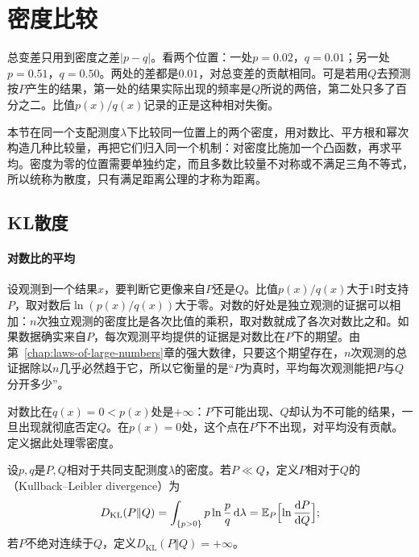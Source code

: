 \section{密度比较}
\label{sec:dcomp-density}

总变差只用到密度之差$\lvert p-q\rvert$。看两个位置：一处$p=0.02$，$q=0.01$；另一处$p=0.51$，$q=0.50$。两处的差都是$0.01$，对总变差的贡献相同。可是若用$Q$去预测按$P$产生的结果，第一处的结果实际出现的频率是$Q$所说的两倍，第二处只多了百分之二。比值$p(x)/q(x)$记录的正是这种相对失衡。

本节在同一个支配测度$\lambda$下比较同一位置上的两个密度，用对数比、平方根和幂次构造几种比较量，再把它们归入同一个机制：对密度比施加一个凸函数，再求平均。密度为零的位置需要单独约定，而且多数比较量不对称或不满足三角不等式，所以统称为散度，只有满足距离公理的才称为距离。

\subsection{KL散度}
\label{sec:dcomp-kl}

\paragraph{对数比的平均}
设观测到一个结果$x$，要判断它更像来自$P$还是$Q$。比值$p(x)/q(x)$大于$1$时支持$P$，取对数后$\ln(p(x)/q(x))$大于零。对数的好处是独立观测的证据可以相加：$n$次独立观测的密度比是各次比值的乘积，取对数就成了各次对数比之和。如果数据确实来自$P$，每次观测平均提供的证据是对数比在$P$下的期望。由第~\ref{chap:laws-of-large-numbers}章的强大数律，只要这个期望存在，$n$次观测的总证据除以$n$几乎必然趋于它，所以它衡量的是“$P$为真时，平均每次观测能把$P$与$Q$分开多少”。

对数比在$q(x)=0<p(x)$处是$+\infty$：$P$下可能出现、$Q$却认为不可能的结果，一旦出现就彻底否定$Q$。在$p(x)=0$处，这个点在$P$下不出现，对平均没有贡献。定义据此处理零密度。

\begin{definition}[KL散度]
\label{def:dcomp-kl}
设$p,q$是$P,Q$相对于共同支配测度$\lambda$的密度。若$P\ll Q$，定义$P$相对于$Q$的（Kullback--Leibler divergence）为
\begin{equation}
 D_{\mathrm{KL}}(P\Vert Q)=\int_{\{p>0\}}p\ln\frac{p}{q}\,\mathrm{d}\lambda=\mathbb{E}_{P}\Bigl[\ln\frac{\mathrm{d}P}{\mathrm{d}Q}\Bigr] ;
 \label{eq:dcomp-kl-def}
\end{equation}
若$P$不绝对连续于$Q$，定义$D_{\mathrm{KL}}(P\Vert Q)=+\infty$。
\end{definition}

